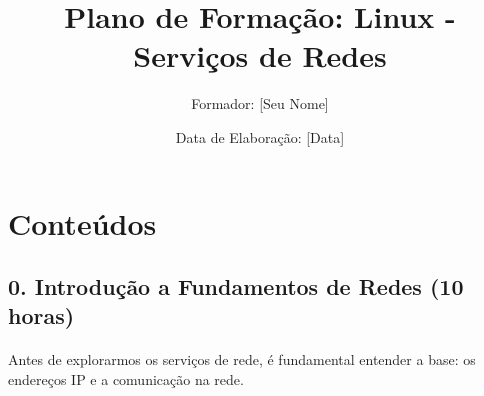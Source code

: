 \documentclass[10pt,a4paper]{article}
\title{Plano de Formação: Linux - Serviços de Redes}
\author{Formador: [Seu Nome]}
\date{Data de Elaboração: [Data]}
\newcommand{\guia}[1]{\textcolor{darkblue}{#1}} %
\begin{document}
	
	\section*{Conteúdos}
	
	\guia{
	}
	\subsection*{0. Introdução a Fundamentos de Redes (10 horas)}
	\vspace{-1.2em}
	\paragraph{}
	Antes de explorarmos os serviços de rede, é fundamental entender a base: os endereços IP e a comunicação na rede.
	
\end{document}

